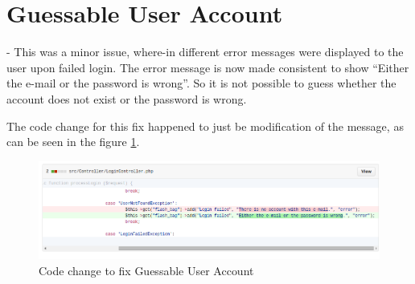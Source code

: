 \section{Guessable User Account} - This was a minor issue, where-in different error messages were displayed to the user upon failed login. The error message is now made consistent to show \enquote{Either the e-mail or the password is wrong}. So it is not possible to guess whether the account does not exist or the password is wrong.

The code change for this fix happened to just be modification of the message, as can be seen in the figure \ref{fig:fix_guessable_account}.

\begin{figure}[ht]
	\centering
	\includegraphics[width=.8\linewidth]{figures/fix_guessable_account.png}
	\caption{Code change to fix Guessable User Account}
	\label{fig:fix_guessable_account}
\end{figure}

\clearpage